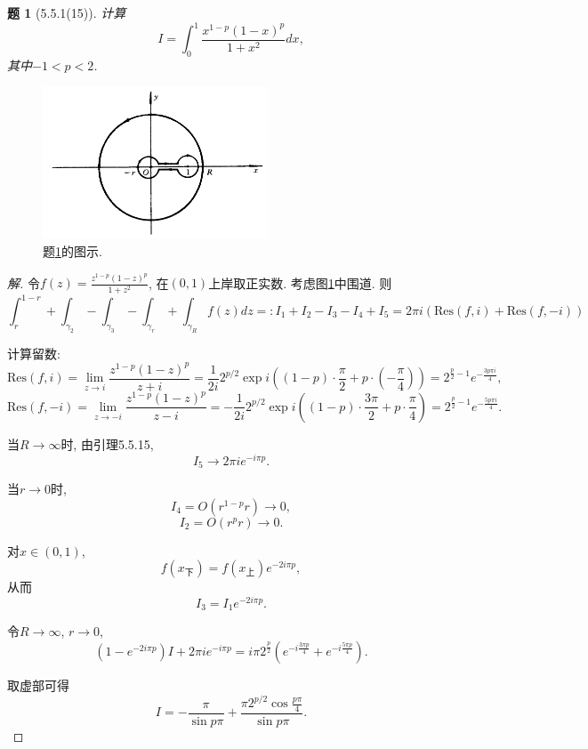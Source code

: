 \documentclass{article}[a4paper, 12pt]
\theoremstyle{mystyle}
\newtheorem{problem}{题}
\newenvironment{solution}{\begin{proof}[解]}{\end{proof}}
\begin{document}
\begin{problem}[5.5.1(15)]\label{15}
  计算\[I=\int_0^1 \frac{x^{1-p}(1-x)^p}{1+x^2}dx,\] 其中\(-1<p<2\).
\end{problem}

\begin{figure}[htbp]
  \centering
  \includegraphics[width=0.6\textwidth]{images/15.png}
  \caption{题\ref{15}的图示.}
  \label{fig:15}
\end{figure}

\begin{solution}
  令\(f(z)=\frac{z^{1-p}(1-z)^p}{1+z^2}\), 在\((0,1)\)上岸取正实数. 考虑图\ref{fig:15}中围道. 则\[\int_{r}^{1-r}+\int_{\gamma_2}-\int_{\gamma_3}-\int_{\gamma_r}+\int_{\gamma_R} f(z)dz=:I_1+I_2-I_3-I_4+I_5=2\pi i\left(\text{Res}(f,i)+\text{Res}(f,-i)\right)\]

  计算留数: \[\text{Res}(f,i)=\lim_{z\to i}\frac{z^{1-p}(1-z)^p}{z+i}=\frac{1}{2i}2^{p/2}\exp i\left((1-p)\cdot\frac{\pi}{2}+p\cdot(-\frac{\pi}{4})\right)=2^{\frac{p}{2}-1}e^{-\frac{3p\pi i}{4}},\] \[\text{Res}(f,-i)=\lim_{z\to -i}\frac{z^{1-p}(1-z)^p}{z-i}=-\frac{1}{2i}2^{p/2}\exp i\left((1-p)\cdot\frac{3\pi}{2}+p\cdot\frac{\pi}{4}\right)=2^{\frac{p}{2}-1}e^{-\frac{5p\pi i}{4}}.\]

  当\(R\to\infty\)时, 由引理5.5.15, \[I_5\to2\pi i e^{-i\pi p}.\]

  当\(r\to0\)时, \[I_4=O(r^{1-p}r)\to 0,\] \[I_2=O(r^p r)\to0.\]

  对\(x\in(0,1)\), \[f(x_{\text{下}})=f(x_{\text{上}})e^{-2i\pi p},\] 从而\[I_3=I_1e^{-2i \pi p}.\]

  令\(R\to\infty\), \(r\to 0\), \[(1-e^{-2i\pi p})I+2\pi ie^{-i\pi p}=i\pi 2^{\frac{p}{2}}\left(e^{-i\frac{3\pi p}{4}}+e^{-i\frac{5\pi p}{4}}\right).\]

  取虚部可得\[I=-\frac{\pi}{\sin p\pi}+\frac{\pi 2^{p/2}\cos \frac{p\pi}{4}}{\sin p\pi}. \tag*{\(\qed\)}\]
  \renewcommand{\qedsymbol}{}
\end{solution}
\end{document}
